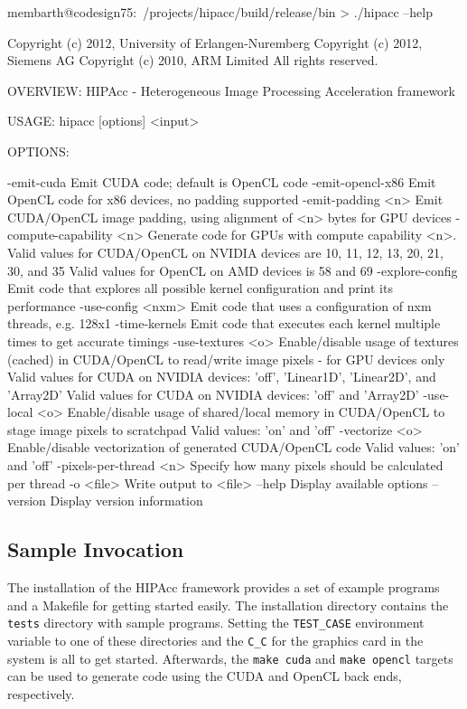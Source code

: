 \lstset{language=bash}
\begin{code}
membarth@codesign75:~/projects/hipacc/build/release/bin > ./hipacc --help

Copyright (c) 2012, University of Erlangen-Nuremberg
Copyright (c) 2012, Siemens AG
Copyright (c) 2010, ARM Limited
All rights reserved.

OVERVIEW: HIPAcc - Heterogeneous Image Processing Acceleration framework

USAGE:  hipacc [options] <input>

OPTIONS:

  -emit-cuda              Emit CUDA code; default is OpenCL code
  -emit-opencl-x86        Emit OpenCL code for x86 devices, no padding supported
  -emit-padding <n>       Emit CUDA/OpenCL image padding, using alignment of <n> bytes for GPU devices
  -compute-capability <n> Generate code for GPUs with compute capability <n>.
                          Valid values for CUDA/OpenCL on NVIDIA devices are 10, 11, 12, 13, 20, 21, 30, and 35
                          Valid values for OpenCL on AMD devices is 58 and 69
  -explore-config         Emit code that explores all possible kernel configuration and print its performance
  -use-config <nxm>       Emit code that uses a configuration of nxm threads, e.g. 128x1
  -time-kernels           Emit code that executes each kernel multiple times to get accurate timings
  -use-textures <o>       Enable/disable usage of textures (cached) in CUDA/OpenCL to read/write image pixels - for GPU devices only
                          Valid values for CUDA on NVIDIA devices: 'off', 'Linear1D', 'Linear2D', and 'Array2D'
                          Valid values for CUDA on NVIDIA devices: 'off' and 'Array2D'
  -use-local <o>          Enable/disable usage of shared/local memory in CUDA/OpenCL to stage image pixels to scratchpad
                          Valid values: 'on' and 'off'
  -vectorize <o>          Enable/disable vectorization of generated CUDA/OpenCL code
                          Valid values: 'on' and 'off'
  -pixels-per-thread <n>  Specify how many pixels should be calculated per thread
  -o <file>               Write output to <file>
  --help                  Display available options
  --version               Display version information
\end{code}


\subsection{Sample Invocation}
The installation of the \ac{HIPAcc} framework provides a set of example programs and a Makefile for getting started easily.
The installation directory contains the \verb|tests| directory with sample programs.
Setting the {\tt TEST\_CASE} environment variable to one of these directories and the {\tt C\_C} for the graphics card in the system is all to get started.
Afterwards, the \verb|make cuda| and \verb|make opencl| targets can be used to generate code using the CUDA and OpenCL back ends, respectively.

